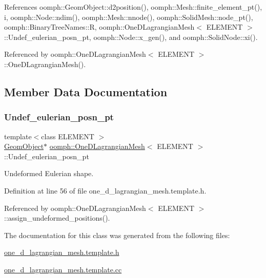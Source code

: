References oomph\+::\+Geom\+Object\+::d2position(), oomph\+::\+Mesh\+::finite\+\_\+element\+\_\+pt(), i, oomph\+::\+Node\+::ndim(), oomph\+::\+Mesh\+::nnode(), oomph\+::\+Solid\+Mesh\+::node\+\_\+pt(), oomph\+::\+Binary\+Tree\+Names\+::R, oomph\+::\+One\+D\+Lagrangian\+Mesh$<$ E\+L\+E\+M\+E\+N\+T $>$\+::\+Undef\+\_\+eulerian\+\_\+posn\+\_\+pt, oomph\+::\+Node\+::x\+\_\+gen(), and oomph\+::\+Solid\+Node\+::xi().



Referenced by oomph\+::\+One\+D\+Lagrangian\+Mesh$<$ E\+L\+E\+M\+E\+N\+T $>$\+::\+One\+D\+Lagrangian\+Mesh().



\subsection{Member Data Documentation}
\mbox{\label{classoomph_1_1OneDLagrangianMesh_af9b27f687d7ec160a01d6ed8c07570ed}} 
\subsubsection{\texorpdfstring{Undef\+\_\+eulerian\+\_\+posn\+\_\+pt}{Undef\_eulerian\_posn\_pt}}
{\footnotesize\ttfamily template$<$class E\+L\+E\+M\+E\+NT $>$ \\
\hyperlink{classoomph_1_1GeomObject}{Geom\+Object}$\ast$ \hyperlink{classoomph_1_1OneDLagrangianMesh}{oomph\+::\+One\+D\+Lagrangian\+Mesh}$<$ E\+L\+E\+M\+E\+NT $>$\+::Undef\+\_\+eulerian\+\_\+posn\+\_\+pt\hspace{0.3cm}{\ttfamily [private]}}



Undeformed Eulerian shape. 



Definition at line 56 of file one\+\_\+d\+\_\+lagrangian\+\_\+mesh.\+template.\+h.



Referenced by oomph\+::\+One\+D\+Lagrangian\+Mesh$<$ E\+L\+E\+M\+E\+N\+T $>$\+::assign\+\_\+undeformed\+\_\+positions().



The documentation for this class was generated from the following files\+:\begin{DoxyCompactItemize}
\item 
\hyperlink{one__d__lagrangian__mesh_8template_8h}{one\+\_\+d\+\_\+lagrangian\+\_\+mesh.\+template.\+h}\item 
\hyperlink{one__d__lagrangian__mesh_8template_8cc}{one\+\_\+d\+\_\+lagrangian\+\_\+mesh.\+template.\+cc}\end{DoxyCompactItemize}
